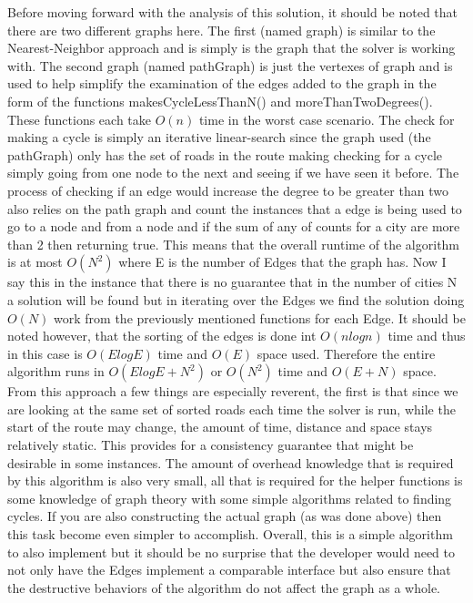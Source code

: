 \documentclass[midd]{thesis}
\newcommand{\tab}{\hspace*{2em}}
\begin{document}
\tab Before moving forward with the analysis of this solution, it should be noted that there are two different graphs here. The first (named graph) is similar to the Nearest-Neighbor approach and is simply is the graph that the solver is working with. The second graph (named pathGraph) is just the vertexes of graph and is used to help simplify the examination of the edges added to the graph in the form of the functions makesCycleLessThanN() and moreThanTwoDegrees(). These functions each take $O(n)$ time in the worst case scenario. The check for making a cycle is simply an iterative linear-search since the graph used (the pathGraph) only has the set of roads in the route making checking for a cycle simply going from one node to the next and seeing if we have seen it before. The process of checking if an edge would increase the degree to be greater than two also relies on the path graph and count the instances that a edge is being used to go to a node and from a node and if the sum of any of counts for a city are more than 2 then returning true. This means that the overall runtime of the algorithm is at most $O(N^2)$ where E is the number of Edges that the graph has. Now I say this in the instance that there is no guarantee that in the number of cities N a solution will be found but in iterating over the Edges we find the solution doing $O(N)$ work from the previously mentioned functions for each Edge. It should be noted however, that the sorting of the edges is done int $O(nlogn)$ time and thus in this case is $O(ElogE)$ time and $O(E)$ space used. Therefore the entire algorithm runs in $O(ElogE + N^2)$ or $O(N^2)$ time and $O(E+N)$ space.\\
\tab From this approach a few things are especially reverent, the first is that since we are looking at the same set of sorted roads each time the solver is run, while the start of the route may change, the amount of time, distance and space stays relatively static. This provides for a consistency guarantee that might be desirable in some instances. The amount of overhead knowledge that is required by this algorithm is also very small, all that is required for the helper functions is some knowledge of graph theory with some simple algorithms related to finding cycles. If you are also constructing the actual graph (as was done above) then this task become even simpler to accomplish. Overall, this is a simple algorithm to also implement but it should be no surprise that the developer would need to not only have the Edges implement a comparable interface but also ensure that the destructive behaviors of the algorithm do not affect the graph as a whole.
\end{document}

